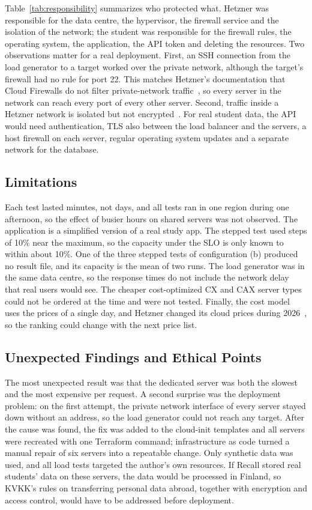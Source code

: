 \documentclass[conference,a4paper]{IEEEtran}
\begin{document}
Table~\ref{tab:responsibility} summarizes who protected what. Hetzner was responsible for the data centre, the hypervisor, the firewall service and the isolation of the network; the student was responsible for the firewall rules, the operating system, the application, the API token and deleting the resources. Two observations matter for a real deployment. First, an SSH connection from the load generator to a target worked over the private network, although the target's firewall had no rule for port 22. This matches Hetzner's documentation that Cloud Firewalls do not filter private-network traffic~\cite{hz-fw}, so every server in the network can reach every port of every other server. Second, traffic inside a Hetzner network is isolated but not encrypted~\cite{hz-net}. For real student data, the API would need authentication, TLS also between the load balancer and the servers, a host firewall on each server, regular operating system updates and a separate network for the database.

\subsection{Limitations}

Each test lasted minutes, not days, and all tests ran in one region during one afternoon, so the effect of busier hours on shared servers was not observed. The application is a simplified version of a real study app. The stepped test used steps of 10\% near the maximum, so the capacity under the SLO is only known to within about 10\%. One of the three stepped tests of configuration (b) produced no result file, and its capacity is the mean of two runs. The load generator was in the same data centre, so the response times do not include the network delay that real users would see. The cheaper cost-optimized CX and CAX server types could not be ordered at the time and were not tested. Finally, the cost model uses the prices of a single day, and Hetzner changed its cloud prices during 2026~\cite{hz-price}, so the ranking could change with the next price list.

\subsection{Unexpected Findings and Ethical Points}

The most unexpected result was that the dedicated server was both the slowest and the most expensive per request. A second surprise was the deployment problem: on the first attempt, the private network interface of every server stayed down without an address, so the load generator could not reach any target. After the cause was found, the fix was added to the cloud-init templates and all servers were recreated with one Terraform command; infrastructure as code turned a manual repair of six servers into a repeatable change. Only synthetic data was used, and all load tests targeted the author's own resources. If Recall stored real students' data on these servers, the data would be processed in Finland, so KVKK's rules on transferring personal data abroad, together with encryption and access control, would have to be addressed before deployment.
\end{document}
